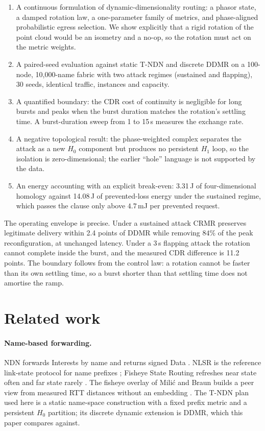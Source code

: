 \documentclass[10pt,a4paper]{article}
\begin{document}
\begin{enumerate}
\item A continuous formulation of dynamic-dimensionality routing: a phasor state, a
damped rotation law, a one-parameter family of metrics, and phase-aligned
probabilistic egress selection. We show explicitly that a rigid rotation of the
point cloud would be an isometry and a no-op, so the rotation must act on the
metric weights.
\item A paired-seed evaluation against static T-NDN and discrete DDMR on a
100-node, 10{,}000-name fabric with two attack regimes (sustained and flapping), 30
seeds, identical traffic, instances and capacity.
\item A quantified boundary: the CDR cost of continuity is negligible for long
bursts and peaks when the burst duration matches the rotation's settling time. A
burst-duration sweep from 1 to 15\,s measures the exchange rate.
\item A negative topological result: the phase-weighted complex separates the
attack as a new $H_0$ component but produces no persistent $H_1$ loop, so the
isolation is zero-dimensional; the earlier ``hole'' language is not supported by
the data.
\item An energy accounting with an explicit break-even: 3.31\,J of four-dimensional
homology against 14.08\,J of prevented-loss energy under the sustained regime,
which passes the clause only above $4.7$\,mJ per prevented request.
\end{enumerate}

The operating envelope is precise. Under a sustained attack CRMR preserves
legitimate delivery within 2.4 points of DDMR while removing $84\%$ of the
peak reconfiguration, at unchanged latency. Under a 3\,s flapping attack the
rotation cannot complete inside the burst, and the measured CDR difference is
11.2 points. The boundary follows from the control law: a rotation cannot be
faster than its own settling time, so a burst shorter than that settling time
does not amortise the ramp.

\section{Related work}
\label{sec:related}

\paragraph{Name-based forwarding.}
NDN forwards Interests by name and returns signed Data \cite{zhang2014ndn}. NLSR
is the reference link-state protocol for name prefixes \cite{hoque2013nlsr};
Fisheye State Routing refreshes near state often and far state rarely
\cite{pei2000fsr}. The fisheye overlay of Mili\'c and Braun builds a peer view
from measured RTT distances without an embedding \cite{milic2009fisheye}. The
T-NDN plan used here is a static name-space construction with a fixed prefix
metric and a persistent $H_0$ partition; its discrete dynamic extension is DDMR,
which this paper compares against.
\end{document}
